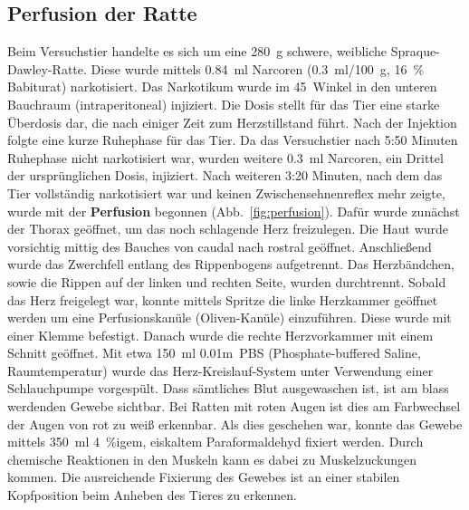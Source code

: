 \documentclass[12pt,a4paper,pdftex]{article}
\begin{document}
\subsection{Perfusion der Ratte}

Beim Versuchstier handelte es sich um eine 280~g schwere, weibliche Spraque-Dawley-Ratte. Diese wurde mittels 0.84~ml Narcoren (0.3~ml/100~g, 16~\% Babiturat) narkotisiert. Das Narkotikum wurde im 45\degree~Winkel in den unteren Bauchraum (intraperitoneal) injiziert. Die Dosis stellt für das Tier eine starke Überdosis dar, die nach einiger Zeit zum Herzstillstand führt. Nach der Injektion folgte eine kurze Ruhephase für das Tier. Da das Versuchstier nach 5:50 Minuten Ruhephase nicht narkotisiert war, wurden weitere 0.3~ml Narcoren, ein Drittel der ursprünglichen Dosis, injiziert. Nach weiteren 3:20 Minuten, nach dem das Tier vollständig narkotisiert war und keinen Zwischensehnenreflex mehr zeigte, wurde mit der \textbf{Perfusion} begonnen (Abb.~\ref{fig:perfusion}). Dafür wurde zunächst der Thorax geöffnet, um das noch schlagende Herz freizulegen. Die Haut wurde vorsichtig mittig des Bauches von caudal nach rostral geöffnet. Anschließend wurde das Zwerchfell entlang des Rippenbogens aufgetrennt. Das Herzbändchen, sowie die Rippen auf der linken und rechten Seite, wurden durchtrennt. Sobald das Herz freigelegt war, konnte mittels Spritze die linke Herzkammer geöffnet werden um eine Perfusionskanüle (Oliven-Kanüle) einzuführen. Diese wurde mit einer Klemme befestigt. Danach wurde die rechte Herzvorkammer mit einem Schnitt geöffnet. Mit etwa 150~ml 0.01m~PBS (Phosphate-buffered Saline, Raumtemperatur) wurde das Herz-Kreislauf-System unter Verwendung einer Schlauchpumpe vorgespült. Dass sämtliches Blut ausgewaschen ist, ist am blass werdenden Gewebe sichtbar. Bei Ratten mit roten Augen ist dies am Farbwechsel der Augen von rot zu weiß erkennbar. Als dies geschehen war, konnte das Gewebe mittels 350~ml 4~\%igem, eiskaltem Paraformaldehyd fixiert werden. Durch chemische Reaktionen in den Muskeln kann es dabei zu Muskelzuckungen kommen. Die ausreichende Fixierung des Gewebes ist an einer stabilen Kopfposition beim Anheben des Tieres zu erkennen.
\end{document}
